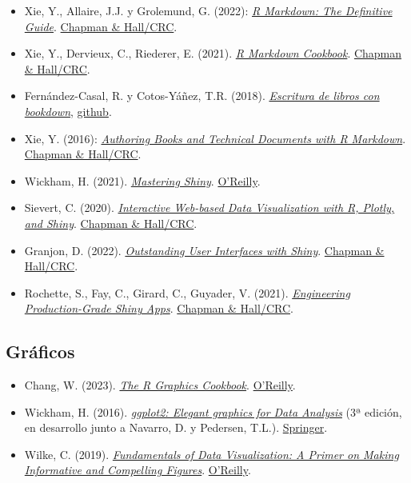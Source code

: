 \documentclass[
]{book}
\theoremstyle{break}
\theoremstyle{nonumberplain}
\begin{document}
\begin{itemize}
\item
  Xie, Y., Allaire, J.J. y Grolemund, G. (2022): \emph{\href{https://bookdown.org/yihui/rmarkdown/}{R Markdown: The Definitive Guide}}. \href{https://www.crcpress.com/p/book/9781138359338}{Chapman \& Hall/CRC}.
\item
  Xie, Y., Dervieux, C., Riederer, E. (2021). \emph{\href{https://bookdown.org/yihui/rmarkdown-cookbook/}{R Markdown Cookbook}}. \href{https://www.routledge.com/p/book/9780367563837}{Chapman \& Hall/CRC}.
\item
  Fernández-Casal, R. y Cotos-Yáñez, T.R. (2018). \emph{\href{https://rubenfcasal.github.io/bookdown_intro}{Escritura de libros con bookdown}}, \href{https://github.com/rubenfcasal/bookdown_intro}{github}.
\item
  Xie, Y. (2016): \emph{\href{https://bookdown.org/yihui/bookdown/}{Authoring Books and Technical Documents with R Markdown}}. \href{https://www.routledge.com/p/book/9781138700109}{Chapman \& Hall/CRC}.
\item
  Wickham, H. (2021). \emph{\href{https://mastering-shiny.org/}{Mastering Shiny}}. \href{https://www.oreilly.com/library/view/mastering-shiny/9781492047377}{O'Reilly}.
\item
  Sievert, C. (2020). \emph{\href{https://plotly-r.com/}{Interactive Web-based Data Visualization with R, Plotly, and Shiny}}. \href{https://www.routledge.com/p/book/9781138331457}{Chapman \& Hall/CRC}.
\item
  Granjon, D. (2022). \emph{\href{https://unleash-shiny.rinterface.com/}{Outstanding User Interfaces with Shiny}}. \href{https://www.routledge.com/p/book/9780367643652}{Chapman \& Hall/CRC}.
\item
  Rochette, S., Fay, C., Girard, C., Guyader, V. (2021). \emph{\href{https://engineering-shiny.org/}{Engineering Production-Grade Shiny Apps}}. \href{https://www.routledge.com/p/book/9780367466022}{Chapman \& Hall/CRC}.
\end{itemize}

\hypertarget{gruxe1ficos-1}{%
\subsection*{Gráficos}\label{gruxe1ficos-1}}

\begin{itemize}
\item
  Chang, W. (2023). \emph{\href{https://r-graphics.org}{The R Graphics Cookbook}}. \href{https://www.amazon.com/dp/1491978600}{O'Reilly}.
\item
  Wickham, H. (2016). \emph{\href{https://ggplot2-book.org}{ggplot2: Elegant graphics for Data Analysis}} (3ª edición, en desarrollo junto a Navarro, D. y Pedersen, T.L.). \href{https://www.amazon.com/gp/product/331924275X}{Springer}.
\item
  Wilke, C. (2019). \emph{\href{https://clauswilke.com/dataviz/}{Fundamentals of Data Visualization: A Primer on Making Informative and Compelling Figures}}. \href{https://www.oreilly.com/library/view/fundamentals-of-data/9781492031079}{O'Reilly}.
\end{itemize}
\end{document}
